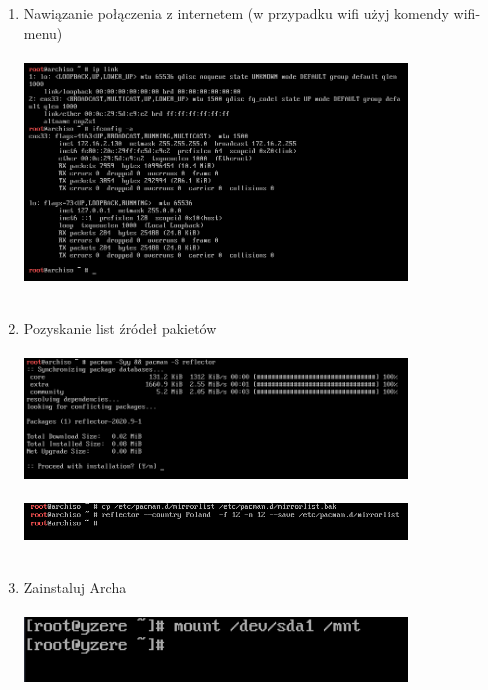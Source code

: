 \documentclass[10pt,a4paper]{article}
\begin{document}
\begin{enumerate}
\item Nawiązanie połączenia z internetem (w przypadku wifi użyj komendy wifi-menu)\\\\
\includegraphics[width=0.8\textwidth, center]{arch7.png}\\\\
\newpage
\item Pozyskanie list źródeł pakietów\\\\
\includegraphics[width=0.8\textwidth, center]{arch8.png}\\\\
\includegraphics[width=0.8\textwidth, center]{arch9.png}\\\\
\item Zainstaluj Archa \\\\
\includegraphics[width=0.8\textwidth, center]{arch10-1.png}\\\\

\end{enumerate}
\end{document}
